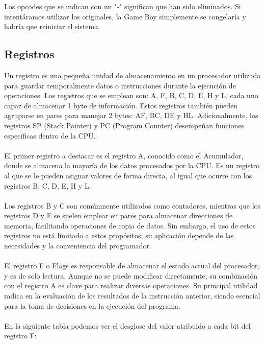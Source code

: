 Los opcodes que se indican con un "-" significan que han sido eliminados. Si intentáramos utilizar los originales, la Game Boy simplemente se congelaría y habría que reiniciar el sistema.

\subsection{Registros}

Un registro es una pequeña unidad de almacenamiento en un procesador utilizada para guardar temporalmente datos o instrucciones durante la ejecución de operaciones. Los registros que se emplean son: A, F, B, C, D, E, H y L, cada uno capaz de almacenar 1 byte de información. Estos registros también pueden agruparse en pares para manejar 2 bytes: AF, BC, DE y HL. Adicionalmente, los registros SP (Stack Pointer) y PC (Program Counter) desempeñan funciones específicas dentro de la CPU.
\\\\
El primer registro a destacar es el registro A, conocido como el Acumulador, donde se almacena la mayoría de los datos procesados por la CPU. Es un registro al que se le pueden asignar valores de forma directa, al igual que ocurre con los registros B, C, D, E, H y L.
\\\\
Los registros B y C son comúnmente utilizados como contadores, mientras que los registros D y E se suelen emplear en pares para almacenar direcciones de memoria, facilitando operaciones de copia de datos. Sin embargo, el uso de estos registros no está limitado a estos propósitos; su aplicación depende de las necesidades y la conveniencia del programador.
\\\\
El registro F o Flags es responsable de almacenar el estado actual del procesador, y es de solo lectura. Aunque no se puede modificar directamente, su combinación con el registro A es clave para realizar diversas operaciones. Su principal utilidad radica en la evaluación de los resultados de la instrucción anterior, siendo esencial para la toma de decisiones en la ejecución del programa.
\\\\
En la siguiente tabla podemos ver el desglose del valor atribuido a cada bit del registro F:

